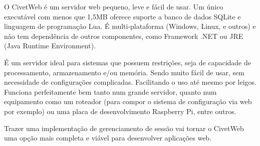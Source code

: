 O CivetWeb é um servidor web pequeno, leve e fácil de usar. Um único executável com menos que 1,5MB oferece suporte a banco de dados SQLite e linguagem de programação Lua. É multi-plataforma (Windows, Linux, e outros) e não tem dependência de outros componentes, como Framework .NET ou JRE (Java Runtime Environment).

É um servidor ideal para sistemas que possuem restrições, seja de capacidade de processamento, armazenamento e/ou memória. Sendo muito fácil de usar, sem necessidade de configurações complicadas. Facilitando o uso até mesmo por leigos. Funciona perfeitamente bem tanto num grande servidor, quanto num equipamento como um roteador (para compor o sistema de configuração via web por exemplo) ou uma placa de desenvolvimento Raspberry Pi, entre outros.

Trazer uma implementação de gerenciamento de sessão vai tornar o CivetWeb uma opção mais completa e viável para desenvolver aplicações web.









